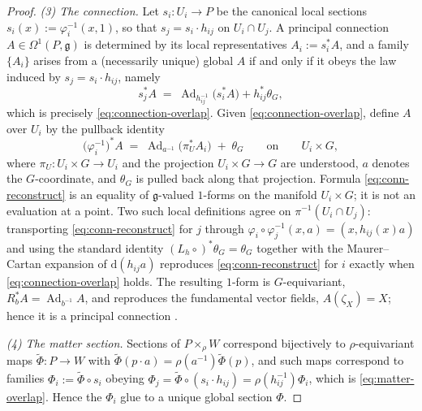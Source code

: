 \documentclass[11pt,a4paper]{article}
\theoremstyle{plain}
\theoremstyle{definition}
\theoremstyle{remark}
\newcommand{\gfrak}{\mathfrak{g}}
\newcommand{\Ad}{\operatorname{Ad}}
\begin{document}
\begin{proof}
\emph{(3) The connection.}
Let $s_i\colon U_i\to P$ be the canonical local sections $s_i(x):=\varphi_i^{-1}(x,1)$, so that
$s_j=s_i\cdot h_{ij}$ on $U_i\cap U_j$. A principal connection $A\in\Omega^1(P,\gfrak)$ is
determined by its local representatives $A_i:=s_i^*A$, and a family $\{A_i\}$ arises from a
(necessarily unique) global $A$ if and only if it obeys the law induced by $s_j=s_i\cdot h_{ij}$,
namely
\[
s_j^*A \;=\; \Ad_{h_{ij}^{-1}}\bigl(s_i^*A\bigr)+h_{ij}^*\theta_G,
\]
which is precisely \eqref{eq:connection-overlap}. Given \eqref{eq:connection-overlap}, define $A$
over $U_i$ by the pullback identity
\begin{equation}
\label{eq:conn-reconstruct}
\bigl(\varphi_i^{-1}\bigr)^{*}A
\;=\;
\Ad_{a^{-1}}\bigl(\pi_U^{*}A_i\bigr)\;+\;\theta_G
\qquad\text{on}\qquad U_i\times G,
\end{equation}
where $\pi_U\colon U_i\times G\to U_i$ and the projection $U_i\times G\to G$ are understood, $a$
denotes the $G$-coordinate, and $\theta_G$ is pulled back along that projection. Formula
\eqref{eq:conn-reconstruct} is an equality of $\gfrak$-valued $1$-forms on the manifold
$U_i\times G$; it is not an evaluation at a point. Two such local definitions agree on
$\pi^{-1}(U_i\cap U_j)$: transporting \eqref{eq:conn-reconstruct} for $j$ through
$\varphi_i\circ\varphi_j^{-1}(x,a)=(x,h_{ij}(x)a)$ and using the standard identity
$(L_{h}\circ)^*\theta_G=\theta_G$ together with the Maurer--Cartan expansion of
$\mathrm{d}(h_{ij}a)$ reproduces \eqref{eq:conn-reconstruct} for $i$ exactly when
\eqref{eq:connection-overlap} holds. The resulting $1$-form is $G$-equivariant,
$R_b^*A=\Ad_{b^{-1}}A$, and reproduces the fundamental vector fields, $A(\zeta_X)=X$; hence it is
a principal connection \cite{KobayashiNomizu1}.

\emph{(4) The matter section.}
Sections of $P\times_\rho W$ correspond bijectively to $\rho$-equivariant maps
$\tilde\Phi\colon P\to W$ with $\tilde\Phi(p\cdot a)=\rho(a^{-1})\tilde\Phi(p)$, and such maps
correspond to families $\Phi_i:=\tilde\Phi\circ s_i$ obeying
$\Phi_j=\tilde\Phi\circ(s_i\cdot h_{ij})=\rho(h_{ij}^{-1})\Phi_i$, which is
\eqref{eq:matter-overlap}. Hence the $\Phi_i$ glue to a unique global section $\Phi$.


\end{proof}
\end{document}
